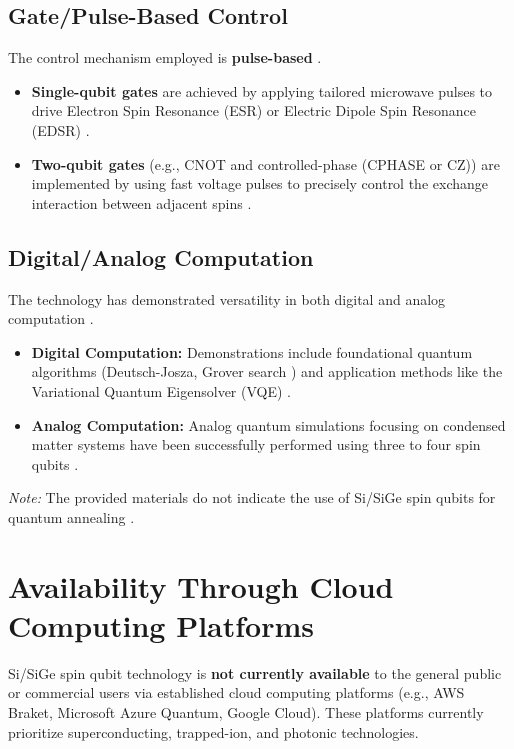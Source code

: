 \subsection{Gate/Pulse-Based Control}
The control mechanism employed is \textbf{pulse-based} \cite{ref2, ref9}.
\begin{itemize}
    \item \textbf{Single-qubit gates} are achieved by applying tailored microwave pulses to drive Electron Spin Resonance (ESR) or Electric Dipole Spin Resonance (EDSR) \cite{ref2, ref9}.
    \item \textbf{Two-qubit gates} (e.g., CNOT and controlled-phase (CPHASE or CZ)) are implemented by using fast voltage pulses to precisely control the exchange interaction between adjacent spins \cite{ref1, ref2, ref9}.
\end{itemize}

\subsection{Digital/Analog Computation}
The technology has demonstrated versatility in both digital and analog computation \cite{ref9}.
\begin{itemize}
    \item \textbf{Digital Computation:} Demonstrations include foundational quantum algorithms (Deutsch-Josza, Grover search \cite{ref2}) and application methods like the Variational Quantum Eigensolver (VQE) \cite{ref9}.
    \item \textbf{Analog Computation:} Analog quantum simulations focusing on condensed matter systems have been successfully performed using three to four spin qubits \cite{ref9}.
\end{itemize}
\emph{Note:} The provided materials do not indicate the use of Si/SiGe spin qubits for quantum annealing \cite{ref8, ref9}.

\section{Availability Through Cloud Computing Platforms}

Si/SiGe spin qubit technology is \textbf{not currently available} to the general public or commercial users via established cloud computing platforms (e.g., AWS Braket, Microsoft Azure Quantum, Google Cloud). These platforms currently prioritize superconducting, trapped-ion, and photonic technologies.

